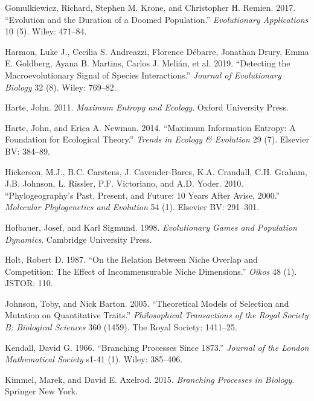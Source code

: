 \documentclass[]{article}
\begin{document}
\leavevmode\hypertarget{ref-Gomulkiewicz2017}{}%
Gomulkiewicz, Richard, Stephen M. Krone, and Christopher H. Remien.
2017. ``Evolution and the Duration of a Doomed Population.''
\emph{Evolutionary Applications} 10 (5). Wiley: 471--84.

\leavevmode\hypertarget{ref-Harmon2019}{}%
Harmon, Luke J., Cecilia S. Andreazzi, Florence Débarre, Jonathan Drury,
Emma E. Goldberg, Ayana B. Martins, Carlos J. Melián, et al. 2019.
``Detecting the Macroevolutionary Signal of Species Interactions.''
\emph{Journal of Evolutionary Biology} 32 (8). Wiley: 769--82.

\leavevmode\hypertarget{ref-Harte2011}{}%
Harte, John. 2011. \emph{Maximum Entropy and Ecology}. Oxford University
Press.

\leavevmode\hypertarget{ref-Harte2014}{}%
Harte, John, and Erica A. Newman. 2014. ``Maximum Information Entropy: A
Foundation for Ecological Theory.'' \emph{Trends in Ecology \&
Evolution} 29 (7). Elsevier BV: 384--89.

\leavevmode\hypertarget{ref-Hickerson2010}{}%
Hickerson, M.J., B.C. Carstens, J. Cavender-Bares, K.A. Crandall, C.H.
Graham, J.B. Johnson, L. Rissler, P.F. Victoriano, and A.D. Yoder. 2010.
``Phylogeography's Past, Present, and Future: 10 Years After Avise,
2000.'' \emph{Molecular Phylogenetics and Evolution} 54 (1). Elsevier
BV: 291--301.

\leavevmode\hypertarget{ref-Hofbauer1998}{}%
Hofbauer, Josef, and Karl Sigmund. 1998. \emph{Evolutionary Games and
Population Dynamics}. Cambridge University Press.

\leavevmode\hypertarget{ref-Holt1987}{}%
Holt, Robert D. 1987. ``On the Relation Between Niche Overlap and
Competition: The Effect of Incommensurable Niche Dimensions.''
\emph{Oikos} 48 (1). JSTOR: 110.

\leavevmode\hypertarget{ref-Johnson2005}{}%
Johnson, Toby, and Nick Barton. 2005. ``Theoretical Models of Selection
and Mutation on Quantitative Traits.'' \emph{Philosophical Transactions
of the Royal Society B: Biological Sciences} 360 (1459). The Royal
Society: 1411--25.

\leavevmode\hypertarget{ref-Kendall1966}{}%
Kendall, David G. 1966. ``Branching Processes Since 1873.''
\emph{Journal of the London Mathematical Society} s1-41 (1). Wiley:
385--406.

\leavevmode\hypertarget{ref-Kimmel2015}{}%
Kimmel, Marek, and David E. Axelrod. 2015. \emph{Branching Processes in
Biology}. Springer New York.
\end{document}
